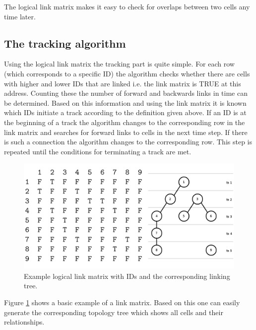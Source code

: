 \documentclass{scrartcl}
\begin{document}
The logical link matrix makes it easy to check for overlaps between two cells any time later.

\subsection{The tracking algorithm}
Using the logical link matrix the tracking part is quite simple. For each row (which corresponds to a specific ID) the algorithm checks whether there are cells with higher and lower IDs that are linked i.e. the link matrix is TRUE at this address. Counting these the number of forward and backwards links in time can be determined. Based on this information and using the link matrix it is known which IDs initiate a track according to the definition given above. If an ID is at the beginning of a track the algorithm changes to the corresponding row in the link matrix and searches for forward links to cells in the next time step. If there is such a connection the algorithm changes to the corresponding row. This step is repeated until the conditions for terminating a track are met.
\begin{figure}[h]
	\centering
	\includegraphics[width=.8\linewidth]{links}
	\caption{Example logical link matrix with IDs and the corresponding linking tree.}
	\label{links}
\end{figure}
Figure \ref{links} shows a basic example of a link matrix. Based on this one can easily generate the corresponding topology tree which shows all cells and their relationships.
\end{document}

